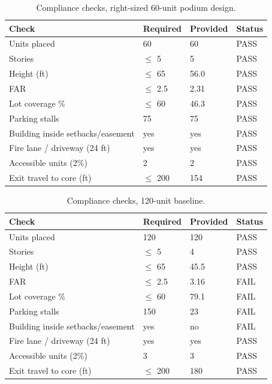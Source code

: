 \documentclass[11pt]{article}
\begin{document}
\begin{table}[H]\centering\footnotesize
\caption{Compliance checks, right-sized 60-unit podium design.}
\begin{tabular}{llll}\toprule Check & Required & Provided & Status \\ \midrule
Units placed & 60 & 60 & PASS \\
Stories & $\le$ 5 & 5 & PASS \\
Height (ft) & $\le$ 65 & 56.0 & PASS \\
FAR & $\le$ 2.5 & 2.31 & PASS \\
Lot coverage \% & $\le$ 60 & 46.3 & PASS \\
Parking stalls & 75 & 75 & PASS \\
Building inside setbacks/easement & yes & yes & PASS \\
Fire lane / driveway (24 ft) & yes & yes & PASS \\
Accessible units (2\%) & 2 & 2 & PASS \\
Exit travel to core (ft) & $\le$ 200 & 154 & PASS \\
\bottomrule\end{tabular}\end{table}
\begin{table}[H]\centering\footnotesize
\caption{Compliance checks, 120-unit baseline.}
\begin{tabular}{llll}\toprule Check & Required & Provided & Status \\ \midrule
Units placed & 120 & 120 & PASS \\
Stories & $\le$ 5 & 4 & PASS \\
Height (ft) & $\le$ 65 & 45.5 & PASS \\
FAR & $\le$ 2.5 & 3.16 & FAIL \\
Lot coverage \% & $\le$ 60 & 79.1 & FAIL \\
Parking stalls & 150 & 23 & FAIL \\
Building inside setbacks/easement & yes & no & FAIL \\
Fire lane / driveway (24 ft) & yes & yes & PASS \\
Accessible units (2\%) & 3 & 3 & PASS \\
Exit travel to core (ft) & $\le$ 200 & 180 & PASS \\
\bottomrule\end{tabular}\end{table}
\end{document}
